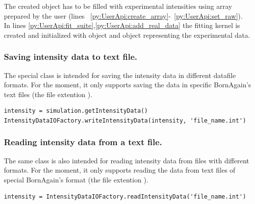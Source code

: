 The created  object has to be filled with experimental intensities
using  array prepared by the user (lines ~\ref{py:UserApi:create_array}-~\ref{py:UserApi:set_raw}). In lines \ref{py:UserApi:fit_suite},\ref{py:UserApi:add_real_data} the fitting kernel is created and initialized with  object and
 object representing the experimental data.


\subsubsection{Saving intensity data to text file.}

The special class  is intended for saving the intensity data
in different datafile formats. For the moment, it only supports saving the data in specific BornAgain's text files (the file extention ).

\begin{lstlisting}
intensity = simulation.getIntensityData()
IntensityDataIOFactory.writeIntensityData(intensity, 'file_name.int')
\end{lstlisting}

\subsubsection{Reading intensity data from a text file.}
The same class is also intended for reading intensity data
from files with different formats. For the moment, it only supports reading the data from text files of special BornAgain's format (the file extention ).

\begin{lstlisting}
intensity = IntensityDataIOFactory.readIntensityData('file_name.int')
\end{lstlisting}
\fi
